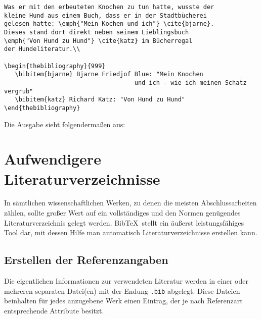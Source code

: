 \begin{verbatim}
Was er mit den erbeuteten Knochen zu tun hatte, wusste der
kleine Hund aus einem Buch, dass er in der Stadtbücherei
gelesen hatte: \emph{"Mein Kochen und ich"} \cite{bjarne}.
Dieses stand dort direkt neben seinem Lieblingsbuch
\emph{"Von Hund zu Hund"} \cite{katz} im Bücherregal
der Hundeliteratur.\\

\begin{thebibliography}{999}
   \bibitem{bjarne} Bjarne Friedjof Blue: "Mein Knochen
   									und ich - wie ich meinen Schatz vergrub"
   \bibitem{katz} Richard Katz: "Von Hund zu Hund"
\end{thebibliography}

\end{verbatim}

Die Ausgabe sieht folgendermaßen aus:


\section{Aufwendigere Literaturverzeichnisse}
In sämtlichen wissenschaftlichen Werken, zu denen die meisten Abschlussarbeiten zählen, sollte großer Wert auf ein vollständiges und den Normen genügendes Literaturverzeichnis gelegt werden. Bib\TeX \ stellt ein äußerst leistungsfähiges Tool dar, mit dessen Hilfe man automatisch Literaturverzeichnisse erstellen kann.

\subsection{Erstellen der Referenzangaben}
Die eigentlichen Informationen zur verwendeten Literatur werden in einer oder mehreren
separaten Datei(en) mit der Endung \texttt{.bib} abgelegt. Diese Dateien beinhalten für
jedes anzugebene Werk einen Eintrag, der je nach Referenzart entsprechende Attribute
besitzt.


